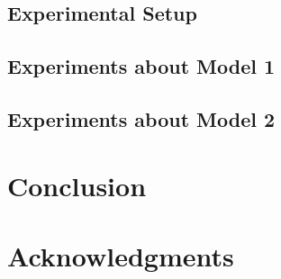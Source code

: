 \documentclass{article}
\begin{document}
\subsection{Experimental Setup}

\subsection{Experiments about Model 1}

\subsection{Experiments about Model 2}

\section{Conclusion}



\section*{Acknowledgments}





\end{document}
